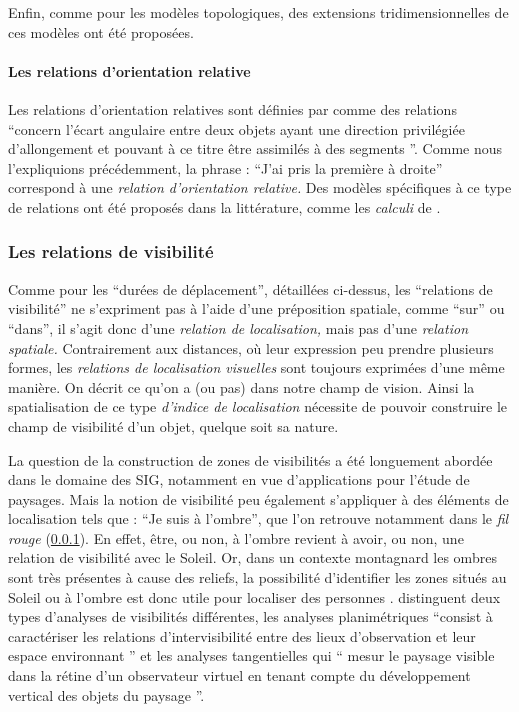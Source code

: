 Enfin, comme pour les modèles topologiques, des extensions
tridimensionnelles de ces modèles ont été proposées.


\paragraph{Les relations d'orientation relative}


Les relations d'orientation relatives sont définies par
\textcite{Duchene2019} comme des relations
\enquote{concern l'écart angulaire entre deux objets
  ayant une direction privilégiée d'allongement et pouvant à ce titre
  être assimilés à des segments \textelp{}}. Comme nous l'expliquions
précédemment, la phrase : \enquote{J'ai pris la première à droite}
correspond à une \emph{relation d'orientation relative.} Des modèles
spécifiques à ce type de relations ont été proposés dans la
littérature, comme les \emph{calculi} de
\textcite{Schlider1995,Isli2000}.

\subsubsection{Les relations de visibilité}

Comme pour les \enquote{durées de déplacement}, détaillées ci-dessus,
les \enquote{relations de visibilité} ne s'expriment pas à l'aide
d'une préposition spatiale, comme \enquote{sur} ou \enquote{dans}, il
s'agit donc d'une \emph{relation de localisation,} mais pas d'une
\emph{relation spatiale.} Contrairement aux distances, où leur
expression peu prendre plusieurs formes, les \emph{relations de
  localisation visuelles} sont toujours exprimées d'une même
manière. On décrit ce qu'on a (ou pas) dans notre champ de
vision. Ainsi la spatialisation de ce type \emph{d'indice de
  localisation} nécessite de pouvoir construire le champ de visibilité
d'un objet, quelque soit sa nature.

La question de la construction de zones de visibilités a été
longuement abordée dans le domaine des SIG, notamment en vue
d’applications pour l'étude de paysages. Mais la notion de visibilité
peu également s'appliquer à des éléments de localisation tels que :
\enquote{Je suis à l'ombre}, que l'on retrouve notamment dans le
\emph{fil rouge} (\ref{}). En effet, être, ou non, à l'ombre revient à
avoir, ou non, une relation de visibilité avec le Soleil. Or, dans un
contexte montagnard les ombres sont très présentes à cause des
reliefs, la possibilité d'identifier les zones situés au Soleil ou à
l'ombre est donc utile pour localiser des personnes
\autocite{Houpert2003}. \textcite{Sahraoui2016} distinguent deux types
d'analyses de visibilités différentes, les analyses planimétriques
\enquote{consist à caractériser les relations
  d’intervisibilité entre des lieux d’observation et leur espace
  environnant \textelp{}} et les analyses tangentielles qui
\enquote{\textelp{} mesur le paysage visible dans la
  rétine d’un observateur virtuel en tenant compte du développement
  vertical des objets du paysage \textelp{}}.


